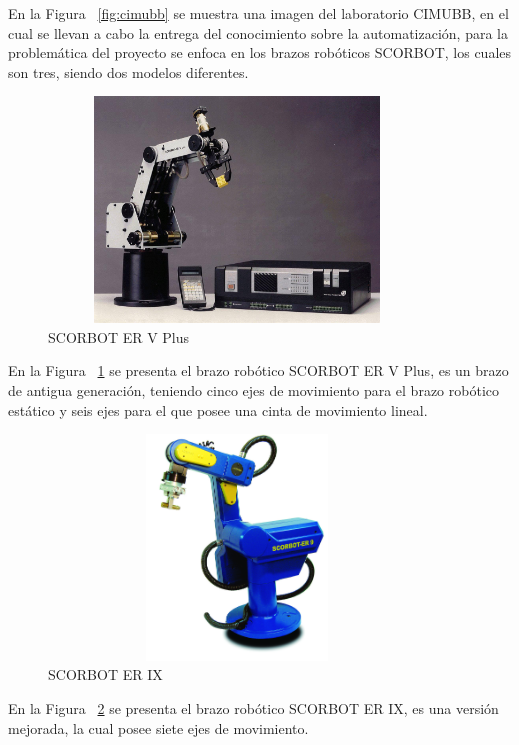  En la Figura ~\ref{fig:cimubb} se muestra una imagen del laboratorio CIMUBB, en el cual se llevan a cabo la entrega del conocimiento sobre la automatización, para la problemática del proyecto se enfoca en los brazos robóticos SCORBOT, los cuales son tres, siendo dos modelos diferentes.\\

\begin{figure}[h]
\centering
\includegraphics[width=10cm, height=6cm]{figures/scor5p.jpg}
\caption{SCORBOT ER V Plus}
\label{fig:scor5p}
\end{figure}

 En la Figura ~\ref{fig:scor5p} se presenta el brazo robótico SCORBOT ER V Plus, es un brazo de antigua generación, teniendo cinco ejes de movimiento para el brazo robótico estático y seis ejes para el que posee una cinta de movimiento lineal.

\clearpage

\begin{figure}[h]
\centering
\includegraphics[width=10cm, height=6cm]{figures/scor9.jpg}
\caption{SCORBOT ER IX}
\label{fig:scor9}
\end{figure}

En la Figura ~\ref{fig:scor9} se presenta el brazo robótico SCORBOT ER IX, es una versión mejorada, la cual posee siete ejes de movimiento.\\

